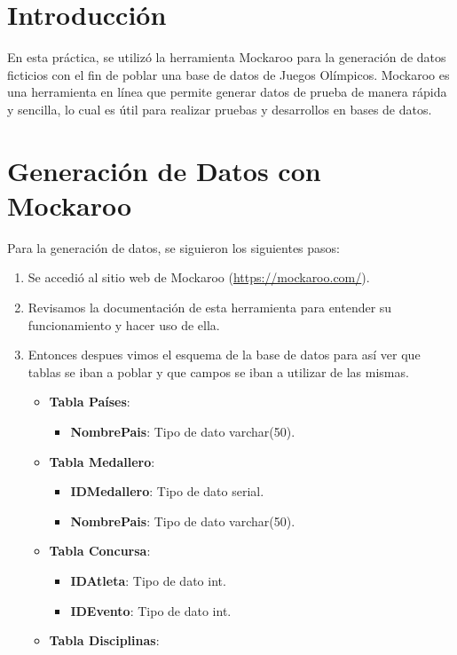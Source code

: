 \section*{Introducción}
En esta práctica, se utilizó la herramienta Mockaroo para la generación de datos ficticios con el fin de poblar una base de datos de Juegos Olímpicos. Mockaroo es una herramienta en línea que permite generar datos de prueba de manera rápida y sencilla, lo cual es útil para realizar pruebas y desarrollos en bases de datos.

\section*{Generación de Datos con Mockaroo}
Para la generación de datos, se siguieron los siguientes pasos:
\begin{enumerate}
    \item Se accedió al sitio web de Mockaroo (\url{https://mockaroo.com/}).
    \item Revisamos la documentación de esta herramienta para entender su funcionamiento y hacer uso de ella.
    \item Entonces despues vimos el esquema de la base de datos para así ver que tablas se iban a poblar y que campos se iban a utilizar de las mismas.
    \begin{itemize}
        \item \textbf{Tabla Países}:
        \begin{itemize}
            \item \textbf{NombrePais}: Tipo de dato varchar(50).
        \end{itemize}
        \item \textbf{Tabla Medallero}:
        \begin{itemize}
            \item \textbf{IDMedallero}: Tipo de dato serial.
            \item \textbf{NombrePais}: Tipo de dato varchar(50).
        \end{itemize}
        \item \textbf{Tabla Concursa}:
        \begin{itemize}
            \item \textbf{IDAtleta}: Tipo de dato int.
            \item \textbf{IDEvento}: Tipo de dato int.
        \end{itemize}
        \item \textbf{Tabla Disciplinas}:
        \begin{itemize}

\end{itemize}
\end{itemize}
\end{enumerate}
